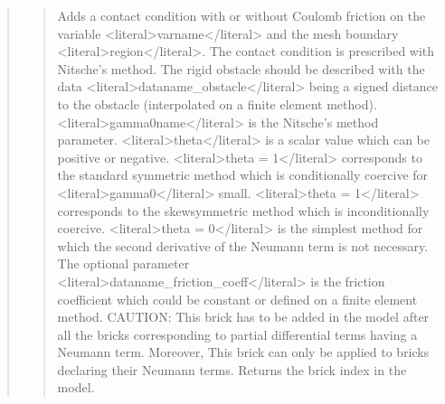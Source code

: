 \documentclass[a4paper,11pt,english]{sphinxmanual}
\begin{document}
\begin{quote}
\begin{quote}
\sphinxAtStartPar
Adds a contact condition with or without Coulomb friction on the variable
\textless{}literal\textgreater{}varname\textless{}/literal\textgreater{} and the mesh boundary \textless{}literal\textgreater{}region\textless{}/literal\textgreater{}. The contact condition
is prescribed with Nitsche’s method. The rigid obstacle should
be described with the data \textless{}literal\textgreater{}dataname\_obstacle\textless{}/literal\textgreater{} being a signed distance to
the obstacle (interpolated on a finite element method).
\textless{}literal\textgreater{}gamma0name\textless{}/literal\textgreater{} is the Nitsche’s method parameter.
\textless{}literal\textgreater{}theta\textless{}/literal\textgreater{} is a scalar value which can be
positive or negative. \textless{}literal\textgreater{}theta = 1\textless{}/literal\textgreater{} corresponds to the standard symmetric
method which is conditionally coercive for  \textless{}literal\textgreater{}gamma0\textless{}/literal\textgreater{} small.
\textless{}literal\textgreater{}theta = \sphinxhyphen{}1\textless{}/literal\textgreater{} corresponds to the skew\sphinxhyphen{}symmetric method which is
inconditionally coercive. \textless{}literal\textgreater{}theta = 0\textless{}/literal\textgreater{} is the simplest method
for which the second derivative of the Neumann term is not necessary.
The optional parameter \textless{}literal\textgreater{}dataname\_friction\_coeff\textless{}/literal\textgreater{} is the friction
coefficient which could be constant or defined on a finite element
method.
CAUTION: This brick has to be added in the model after all the bricks
corresponding to partial differential terms having a Neumann term.
Moreover, This brick can only be applied to bricks declaring their
Neumann terms. Returns the brick index in the model.
\end{quote}

\sphinxAtStartPar
{}
\begin{quote}


\end{quote}
\end{quote}
\end{document}

